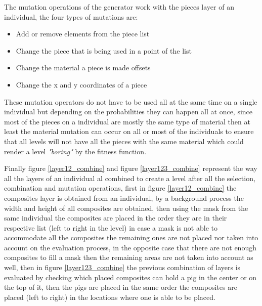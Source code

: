 \documentclass[conference]{IEEEtran}
\begin{document}
    The mutation operations of the generator work with the pieces layer of an
    individual, the four types of mutations are:
    
    \begin{itemize}
        \item Add or remove elements from the piece list
        \item Change the piece that is being used in a point of the list
        \item Change the material a piece is made offsets
        \item Change the x and y coordinates of a piece
    \end{itemize}
    
    These mutation operators do not have to be used all at the same time on a single
    individual but depending on the probabilities they can happen all at once,
    since most of the pieces on a individual are mostly the same type of
    material then at least the material mutation can occur on all or most of
    the individuals to ensure that all levels will not have all the pieces with
    the same material which could render a level \textit{"boring"} by the
    fitness function.
    

    
    Finally figure \ref{layer12_combine} and figure \ref{layer123_combine} represent 
    the way all the layers of an individual al combined to create a level after all 
    the selection, combination and mutation operations, first in figure \ref{layer12_combine}
    the composites layer is obtained from an individual, by a background process the 
    width and height of all composites are obtained, then using the mask from the same 
    individual the composites are placed in the order they are in their respective list 
    (left to right in the level) in case a mask is not able to accommodate all the 
    composites the remaining ones are not placed nor taken into account on the evaluation 
    process, in the opposite case that there are not enough composites to fill a mask 
    then the remaining areas are not taken into account as well, then in figure \ref{layer123_combine} 
    the previous combination of layers is evaluated by checking which placed composites 
    can hold a pig in the center or on the top of it, then the pigs are placed in the 
    same order the composites are placed (left to right) in the locations where one 
    is able to be placed.
    
\end{document}
